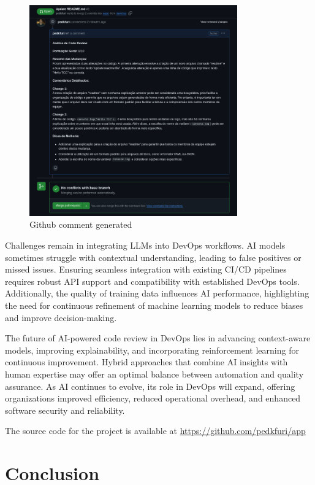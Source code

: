 \documentclass[12pt]{article}
\begin{document}
\begin{figure}[ht]
    \centering
    \includegraphics[width=0.8\textwidth]{github.png}
    \caption{Github comment generated}
    \label{fig:github}
\end{figure}

Challenges remain in integrating LLMs into DevOps workflows. AI models sometimes struggle with contextual understanding, leading to false positives or missed issues. Ensuring seamless integration with existing CI/CD pipelines requires robust API support and compatibility with established DevOps tools. Additionally, the quality of training data influences AI performance, highlighting the need for continuous refinement of machine learning models to reduce biases and improve decision-making. \cite{integratingAIDevops}
    
The future of AI-powered code review in DevOps lies in advancing context-aware models, improving explainability, and incorporating reinforcement learning for continuous improvement. Hybrid approaches that combine AI insights with human expertise may offer an optimal balance between automation and quality assurance. As AI continues to evolve, its role in DevOps will expand, offering organizations improved efficiency, reduced operational overhead, and enhanced software security and reliability. \cite{intelligentDevops}

The source code for the project is available at \url{https://github.com/pedkfuri/app}

\section{Conclusion}
\end{document}
